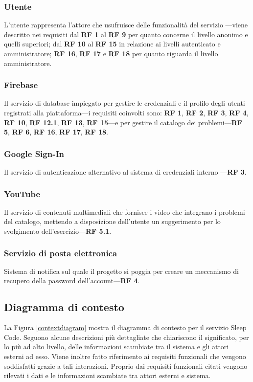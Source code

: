 \documentclass[11pt, a4paper]{article}
\theoremstyle{definition} %
\begin{document}
\subsubsection{Utente}
L'utente rappresenta l'attore che usufruisce delle funzionalità del servizio
—viene descritto nei requisiti dal \textbf{RF 1} al \textbf{RF 9} per quanto
concerne il livello anonimo e quelli superiori; dal \textbf{RF 10} al
\textbf{RF 15} in relazione ai livelli autenticato e amministratore; \textbf{RF 16},
\textbf{RF 17} e \textbf{RF 18} per quanto riguarda il livello amministratore.

\subsubsection{Firebase}
Il servizio di database impiegato per gestire le credenziali e il profilo
degli utenti registrati alla piattaforma—i requisiti coinvolti sono: \textbf{RF 1},
\textbf{RF 2}, \textbf{RF 3}, \textbf{RF 4}, \textbf{RF 10}, \textbf{RF 12.1},
\textbf{RF 13}, \textbf{RF 15}—e per gestire il catalogo dei problemi—\textbf{RF 5}, \textbf{RF 6},
\textbf{RF 16}, \textbf{RF 17}, \textbf{RF 18}.

\subsubsection{Google Sign-In}
Il servizio di autenticazione alternativo al sistema di credenziali interno
—\textbf{RF 3}.

\subsubsection{YouTube}
Il servizio di contenuti multimediali che fornisce i video che integrano
i problemi del catalogo, mettendo a disposizione dell'utente un suggerimento per lo
svolgimento dell'esercizio—\textbf{RF 5.1}.

\subsubsection{Servizio di posta elettronica}
Sistema di notifica sul quale il progetto si poggia per creare un
meccanismo di recupero della password dell'account—\textbf{RF 4}.

\newpage
\subsection{Diagramma di contesto} %
La Figura \ref{contextdiagram} mostra il diagramma di contesto per il
servizio Sleep Code. Seguono alcune descrizioni più dettagliate
che chiariscono il significato, per lo più ad alto livello, delle
informazioni scambiate tra il sistema e gli attori esterni ad esso.
Viene inoltre fatto riferimento ai requisiti funzionali che vengono
soddisfatti grazie a tali interazioni. Proprio dai requisiti funzionali
citati vengono rilevati i dati e le informazioni scambiate tra attori
esterni e sistema.
\end{document}
